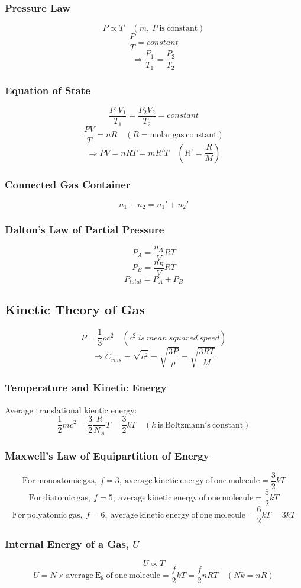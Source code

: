 \documentclass{article}
\begin{document}
\subsubsection*{Pressure Law}
\[P\propto T\quad(m,\ P\ \mathrm{is\ constant})\]
\[\frac{P}{T}=constant\]
\[\Rightarrow \frac{P_1}{T_1}=\frac{P_2}{T_2}\]

\subsubsection*{Equation of State}
\[\frac{P_1V_1}{T_1}=\frac{P_2V_2}{T_2}=constant\]
\[\frac{PV}{T}=nR\quad(R=\mathrm{molar\ gas\ constant})\]
\[\Rightarrow PV=nRT=mR'T\quad(R'=\frac{R}{M})\]

\subsubsection*{Connected Gas Container}
\[n_1 + n_2 = n_1'+n_2'\]

\subsubsection*{Dalton's Law of Partial Pressure}
\[P_A=\frac{n_A}{V}RT\]
\[P_B=\frac{n_B}{V}RT\]
\[P_{total}=P_A+P_B\]

\subsection*{Kinetic Theory of Gas}
\[P=\frac{1}{3}\rho \overline{c^2}\quad(\overline{c^2}\ is\ mean\ squared\ speed)\]
\[\Rightarrow C_{rms}=\sqrt{\overline{c^2}}=\sqrt{\frac{3P}{\rho}}=\sqrt{\frac{3RT}{M}}\]

\subsubsection*{Temperature and Kinetic Energy}
Average translational kientic energy:
\[\frac{1}{2}m\overline{c^2}=\frac{3}{2}\frac{R}{N_A}T=\frac{3}{2}kT\quad(k\ \mathrm{is\ Boltzmann's\ constant})\]

\subsubsection*{Maxwell's Law of Equipartition of Energy}
\[\mathrm{For\ monoatomic\ gas,\ }f=3,\ \mathrm{average\ kinetic\ energy\ of\ one\ molecule}=\frac{3}{2}kT\]
\[\mathrm{For\ diatomic\ gas,\ }f=5,\ \mathrm{average\ kinetic\ energy\ of\ one\ molecule}=\frac{5}{2}kT\]
\[\mathrm{For\ polyatomic\ gas,\ }f=6,\ \mathrm{average\ kinetic\ energy\ of\ one\ molecule}=\frac{6}{2}kT=3kT\]

\subsubsection*{Internal Energy of a Gas, \(U\)}
\[U\propto T\]
\[U = N\times\mathrm{average\ E_k\ of\ one\ molecule}=\frac{f}{2}kT=\frac{f}{2}nRT\quad(Nk=nR)\]
\end{document}
